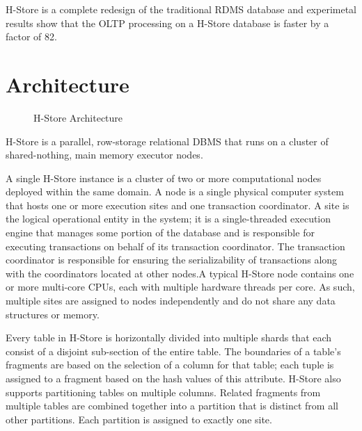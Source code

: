 \documentclass[9pt,twocolumn,twoside]{styles/osajnl}
\begin{document}
H-Store is a complete redesign of the traditional RDMS database and 
experimetal results show that the OLTP processing on a H-Store database is faster 
by a factor of 82.  \cite{stonebraker2007}

\section{Architecture}

\begin{figure}[htbp]
\centering
{}
\caption{H-Store Architecture}
\label{fig:false-color}
\end{figure}

H-Store is a parallel, row-storage relational DBMS that runs on a cluster of shared-nothing, main memory executor nodes.

A single H-Store instance is a cluster of two or more computational nodes deployed within the same domain. A node is a single physical computer system that hosts one or more execution sites and one transaction coordinator. A site is the logical operational entity in the system; it is a single-threaded execution engine that manages some portion of the database and is responsible for executing transactions on behalf of its transaction coordinator. The transaction coordinator is responsible for ensuring the serializability of transactions along with the coordinators located at other nodes.A typical H-Store node contains one or more multi-core CPUs, each with multiple hardware threads per core. As such, multiple sites are assigned to nodes independently and do not share any data structures or memory.

Every table in H-Store is horizontally divided into multiple shards that each consist of a disjoint sub-section of the entire table. The boundaries of a table’s fragments are based on the selection of a  column for that table; each tuple is assigned to a fragment based on the hash values of this attribute. H-Store also supports partitioning tables on multiple columns. Related fragments from multiple tables are combined together into a partition that is distinct from all other partitions. Each partition is assigned to exactly one site.
\end{document}
